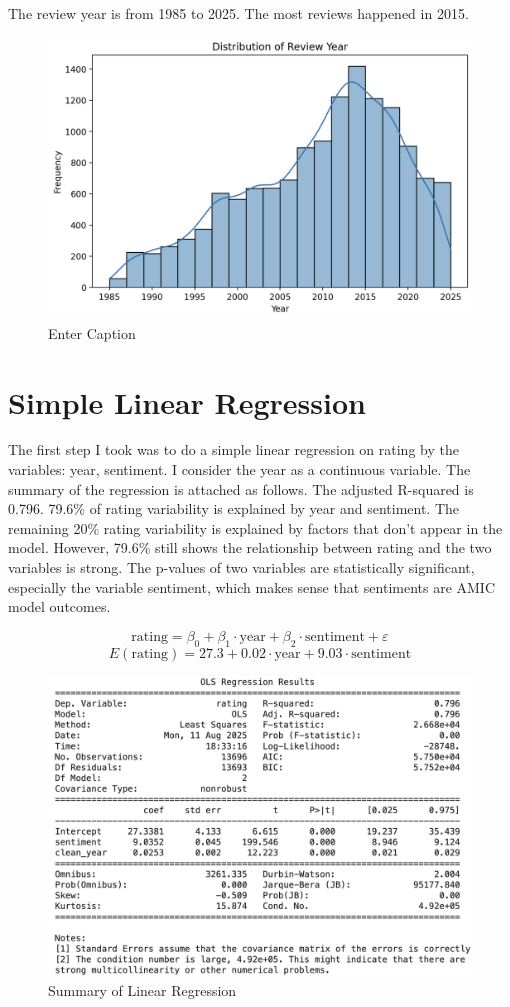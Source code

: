 \documentclass{article}
\begin{document}
The review year is from 1985 to 2025. The most reviews happened in 2015.
\begin{figure}[!ht]
    \centering
    \includegraphics[width=0.5\linewidth]{review_year.png}
    \caption{Enter Caption}
    \label{fig:placeholder}
\end{figure}

\section{Simple Linear Regression}
The first step I took was to do a simple linear regression on rating by the variables: year, sentiment. I consider the year as a continuous variable. The summary of the regression is attached as follows. The adjusted R-squared is 0.796. 79.6\% of rating variability is explained by year and sentiment. The remaining 20\% rating variability is explained by factors that don't appear in the model. However, 79.6\% still shows the relationship between rating and the two variables is strong. The p-values of two variables are statistically significant, especially the variable sentiment, which makes sense that sentiments are AMIC model outcomes.  

$$\text{rating} = \beta_0 + \beta_1 \cdot \text{year} + \beta_2 \cdot \text{sentiment} + \varepsilon$$
$$E(\text{rating}) = 27.3 + 0.02 \cdot \text{year} + 9.03 \cdot \text{sentiment}$$
\begin{figure}[!ht]
    \centering
    \includegraphics[width=0.5\linewidth]{linear_regression.png}
    \caption{Summary of Linear Regression}
    \label{fig:placeholder}
\end{figure}
\end{document}
